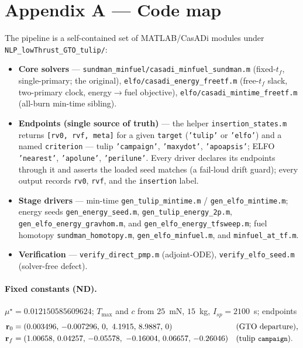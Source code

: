 \documentclass[11pt]{article}
\newcommand{\code}[1]{\texttt{\small #1}}
\newcommand{\file}[1]{\texttt{\small #1}}
\newcommand{\rv}{\mathbf{r}}
\newcommand{\muS}{\mu^\star}
\newcommand{\Tmax}{T_{\max}}
\begin{document}
\section*{Appendix A --- Code map}\label{sec:code-endpoints}
\noindent The pipeline is a self-contained set of MATLAB/CasADi modules under
\file{NLP\_lowThrust\_GTO\_tulip/}:
\begin{itemize}\itemsep1pt
  \item \textbf{Core solvers} --- \file{sundman\_minfuel/casadi\_minfuel\_sundman.m}
        (fixed-$t_f$, single-primary; the original), \file{elfo/casadi\_energy\_freetf.m}
        (free-$t_f$ slack, two-primary clock, energy$\to$fuel objective),
        \file{elfo/casadi\_mintime\_freetf.m} (all-burn min-time sibling).
  \item \textbf{Endpoints (single source of truth)} --- the helper
        \file{insertion\_states.m} returns \code{[rv0, rvf, meta]} for a given
        \code{target} (\code{'tulip'} or \code{'elfo'}) and a named
        \code{criterion} --- tulip \code{'campaign'}, \code{'maxydot'},
        \code{'apoapsis'}; ELFO \code{'nearest'}, \code{'apolune'},
        \code{'perilune'}. Every driver declares its endpoints through it and
        asserts the loaded seed matches (a fail-loud drift guard); every output
        records \code{rv0}, \code{rvf}, and the \code{insertion} label.
  \item \textbf{Stage drivers} --- min-time
        \file{gen\_tulip\_mintime.m} / \file{gen\_elfo\_mintime.m};
        energy seeds \file{gen\_energy\_seed.m}, \file{gen\_tulip\_energy\_2p.m},
        \file{gen\_elfo\_energy\_gravhom.m}, and
        \file{gen\_elfo\_energy\_tfsweep.m};
        fuel homotopy \file{sundman\_homotopy.m}, \file{gen\_elfo\_minfuel.m},
        and \file{minfuel\_at\_tf.m}.
  \item \textbf{Verification} --- \file{verify\_direct\_pmp.m} (adjoint-ODE),
        \file{verify\_elfo\_seed.m} (solver-free defect).
\end{itemize}

\paragraph{Fixed constants (ND).} $\muS=0.012150585609624$; $\Tmax$ and $c$
from $25$~mN, $15$~kg, $I_{sp}=2100$~s; endpoints
\begin{align*}
  \rv_0 &= (0.003496,\,-0.007296,\,0,\ 4.1915,\,8.9887,\,0)
          &&\text{(GTO departure)},\\
  \rv_f &= (1.00658,\,0.04257,\,-0.05578,\ -0.16004,\,0.06657,\,-0.26046)
          &&\text{(tulip \code{campaign})}.
\end{align*}
\end{document}
